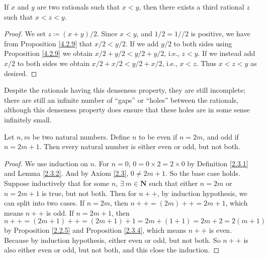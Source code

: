 \begin{proposition}\label{4.4.3}
    If \(x\) and \(y\) are two rationals such that \(x < y\), then there exists a third rational \(z\) such that \(x < z < y\).
\end{proposition}

\begin{proof}
    We set \(z \coloneqq (x + y) / 2\).
    Since \(x < y\), and \(1 / 2 = 1 // 2\) is positive, we have from Proposition \ref{4.2.9} that \(x / 2 < y / 2\).
    If we add \(y / 2\) to both sides using Proposition \ref{4.2.9} we obtain \(x / 2 + y / 2 < y / 2 + y / 2\), i.e., \(z < y\).
    If we instead add \(x / 2\) to both sides we obtain \(x / 2 + x / 2 < y / 2 + x / 2\), i.e., \(x < z\).
    Thus \(x < z < y\) as desired.
\end{proof}

\begin{note}
    Despite the rationals having this denseness property, they are still incomplete;
    there are still an infinite number of ``gaps'' or ``holes'' between the rationals, although this denseness property does ensure that these holes are in some sense infinitely small.
\end{note}

\begin{additional corollary}\label{ac 4.4.1}
Let \(n, m\) be two natural numbers.
Define \(n\) to be even if \(n = 2m\), and odd if \(n = 2m + 1\).
Then every natural number is either even or odd, but not both.
\end{additional corollary}

\begin{proof}
    We use induction on \(n\).
    For \(n = 0\), \(0 = 0 \times 2 = 2 \times 0\) by Definition \ref{2.3.1} and Lemma \ref{2.3.2}.
    And by Axiom \ref{2.3}, \(0 \neq 2m + 1\).
    So the base case holds.
    Suppose inductively that for some \(n\), \(\exists\ m \in \mathbf{N}\) such that either \(n = 2m\) or \(n = 2m + 1\) is true, but not both.
    Then for \(n++\), by induction hypothesis, we can split into two cases.
    If \(n = 2m\), then \(n++ = (2m)++ = 2m + 1\), which means \(n++\) is odd.
    If \(n = 2m + 1\), then \(n++ = (2m + 1)++ = (2m + 1) + 1 = 2m + (1 + 1) = 2m + 2 = 2(m + 1)\) by Proposition \ref{2.2.5} and Proposition \ref{2.3.4}, which means \(n++\) is even.
    Because by induction hypothesis, either even or odd, but not both.
    So \(n++\) is also either even or odd, but not both, and this close the induction.
\end{proof}

